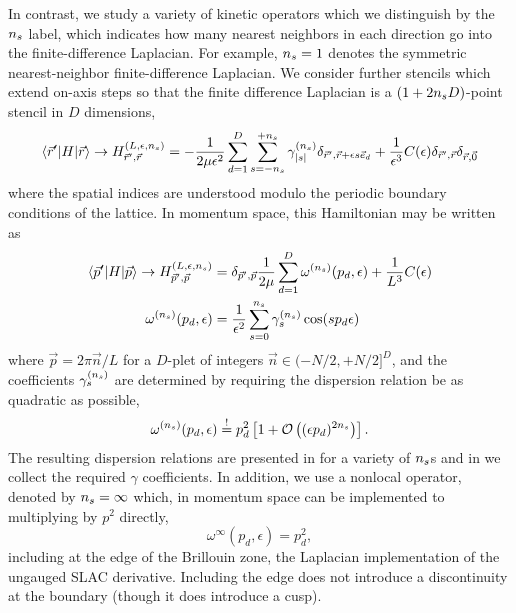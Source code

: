 In contrast, we study a variety of kinetic operators which we distinguish by the ${n_s}$ label, which indicates how many nearest neighbors in each direction go into the finite-difference Laplacian.
For example, ${n_s}=1$ denotes the symmetric nearest-neighbor finite-difference Laplacian.
We consider further stencils which extend on-axis steps so that the finite difference Laplacian is a $(1+2{n_s} D)$-point stencil in $D$ dimensions,
\begin{equation}
    \left\langle \vec{r}' \middle| H \middle| \vec{r} \right\rangle
    \rightarrow
    H_{\vec{r}',\vec{r}}^{(L,\epsilon,{n_s})}
    =
    - \frac{1}{2 \mu \epsilon^2}
        \sum_{d=1}^{D} \sum_{s=-{n_s}}^{+{n_s}}
            \gamma^{({n_s})}_{|s|} \delta_{\vec{r}',\vec{r}+\epsilon s \vec{e}_d}
    + \frac{1}{\epsilon^3}C(\epsilon) \delta_{\vec{r}',\vec{r}}\delta_{\vec{r},\vec{0}}
\end{equation}
where the spatial indices are understood modulo the periodic boundary conditions of the lattice.
In momentum space, this Hamiltonian may be written as
\begin{align}
    \label{eq:p space hamiltonian}
    \left\langle \vec{p}' \middle| H \middle| \vec{p} \right\rangle
    \rightarrow
    H_{\vec{p}',\vec{p}}^{(L,\epsilon,{n_s})}
    &=
    \delta_{\vec{p}',\vec{p}} \frac{1}{2\mu} \sum_{d=1}^{D} \omega^{({n_s})}(p_d,\epsilon)
    +\frac{1}{L^3}C(\epsilon)
    \\
    \label{eq:gamma definition}
    \omega^{({n_s})}(p_d,\epsilon)
    &= \frac{1}{\epsilon^2} \sum_{s=0}^{{n_s}} \gamma_{s}^{({n_s})} \cos(s p_d \epsilon)
\end{align}
where $\vec{p} = 2\pi \vec{n}/L$ for a $D$-plet of integers $\vec{n} \in (-N/2, +N/2]^D$, and the coefficients $\gamma_{s}^{({n_s})}$ are determined by requiring the dispersion relation be as quadratic as possible,
\begin{equation}
    \label{eq:gamma determination}
    \omega^{({n_s})}(p_d,\epsilon) \overset{!}{=} p_d^2 \left[ 1 + \mathcal{O}\left((\epsilon p_d)^{2{n_s}}\right)\right].
\end{equation}
The resulting dispersion relations are presented in  for a variety of ${n_s}$s and
in  we collect the required $\gamma$ coefficients.
In addition, we use a nonlocal operator, denoted by ${n_s}=\infty$ which, in momentum space can be implemented to multiplying by $p^2$ directly,
\begin{equation}
    \omega^{\infty}(p_d,\epsilon) = p_d^2,
\end{equation}
including at the edge of the Brillouin zone, the Laplacian implementation of the ungauged SLAC derivative.
Including the edge does not introduce a discontinuity at the boundary (though it does introduce a cusp).

